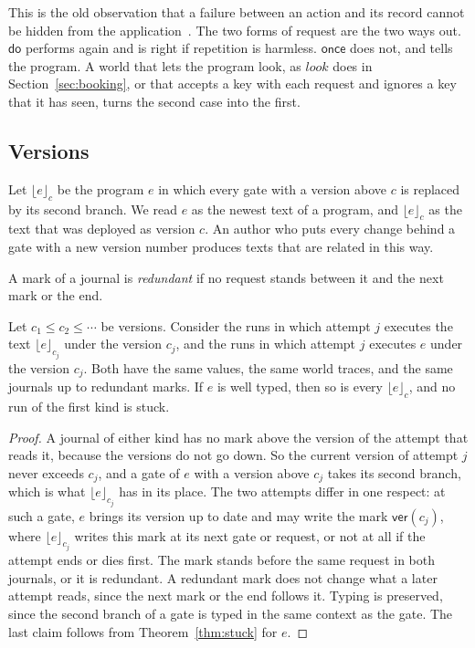 \documentclass[acmsmall,nonacm,screen]{acmart}
\newcommand{\kw}[1]{\mathsf{#1}}
\newcommand{\nm}[1]{\mathit{#1}}
\newcommand{\ver}[1]{\kw{ver}(#1)}
\newcommand{\strip}[2]{\lfloor #2 \rfloor_{#1}}
\begin{document}
This is the old observation that a failure between an action and its record cannot be hidden
from the application~\citep{saltzer1984,elnozahy2002}. The two forms of request are the two
ways out. $\kw{do}$ performs again and is right if repetition is harmless. $\kw{once}$ does
not, and tells the program. A world that lets the program look, as $\nm{look}$ does in
Section~\ref{sec:booking}, or that accepts a key with each request and ignores a key that it
has seen, turns the second case into the first.

\subsection{Versions}

Let $\strip{c}{e}$ be the program $e$ in which every gate with a version above $c$ is replaced
by its second branch. We read $e$ as the newest text of a program, and $\strip{c}{e}$ as the
text that was deployed as version $c$. An author who puts every change behind a gate with a
new version number produces texts that are related in this way.

A mark of a journal is \emph{redundant} if no request stands between it and the next mark or
the end.

\begin{theorem}[Versions]
\label{thm:versions}
Let $c_1 \le c_2 \le \cdots$ be versions. Consider the runs in which attempt $j$ executes the
text $\strip{c_j}{e}$ under the version $c_j$, and the runs in which attempt $j$ executes $e$
under the version $c_j$. Both have the same values, the same world traces, and the same
journals up to redundant marks. If $e$ is well typed, then so is every $\strip{c}{e}$, and no
run of the first kind is stuck.
\end{theorem}

\begin{proof}
A journal of either kind has no mark above the version of the attempt that reads it, because
the versions do not go down. So the current version of attempt $j$ never exceeds $c_j$, and a
gate of $e$ with a version above $c_j$ takes its second branch, which is what
$\strip{c_j}{e}$ has in its place. The two attempts differ in one respect: at such a gate, $e$
brings its version up to date and may write the mark $\ver{c_j}$, where $\strip{c_j}{e}$
writes this mark at its next gate or request, or not at all if the attempt ends or dies
first. The mark stands before the same request in both journals, or it is redundant. A
redundant mark does not change what a later attempt reads, since the next mark or the end
follows it. Typing is preserved, since the second branch of a gate is typed in the same
context as the gate. The last claim follows from Theorem~\ref{thm:stuck} for $e$.
\end{proof}
\end{document}
